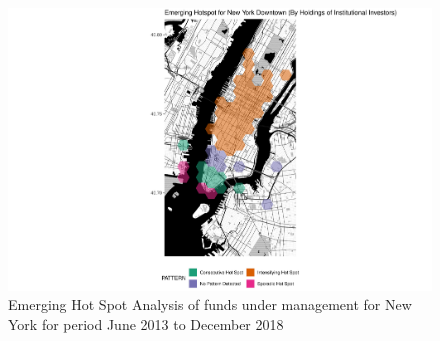 \begin{figure}
	\centering
	\includegraphics[width=1\linewidth]{Figures/ChapterIV/NY_Money_EH_Downtown}
	\caption[Emerging Hot Spot Analysis of Funds Under Management for Downtown New York 2013-2018]{Emerging Hot Spot Analysis of funds under management for New York for period June 2013 to December 2018}
	\label{fig:NYCmoneyhotspot_Downtown}
\end{figure}


